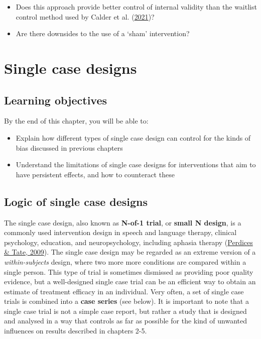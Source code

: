 \documentclass{krantz}
\providecommand{\tightlist}{%
\setlength{\itemsep}{0pt}\setlength{\parskip}{0pt}}
\begin{document}
\begin{itemize}
\tightlist
\item
  Does this approach provide better control of internal validity than the waitlist control method used by Calder et al. (\protect\hyperlink{ref-calder2021}{2021})?
\item
  Are there downsides to the use of a `sham' intervention?
\end{itemize}

\hypertarget{Single}{%
\chapter{Single case designs}\label{Single}}

\hypertarget{learning-objectives-18}{%
\section{Learning objectives}\label{learning-objectives-18}}

By the end of this chapter, you will be able to:

\begin{itemize}
\item
  Explain how different types of single case design can control for the kinds of bias discussed in previous chapters
\item
  Understand the limitations of single case designs for interventions that aim to have persistent effects, and how to counteract these
\end{itemize}

\hypertarget{logic-of-single-case-designs}{%
\section{Logic of single case designs}\label{logic-of-single-case-designs}}

The single case design, also known as \textbf{N-of-1 trial}, or \textbf{small N design}, is a commonly used intervention design in speech and language therapy, clinical psychology, education, and neuropsychology, including aphasia therapy (\protect\hyperlink{ref-perdices2009}{Perdices \& Tate, 2009}). The single case design may be regarded as an extreme version of a \emph{within-subjects} design, where two more more conditions are compared within a single person. This type of trial is sometimes dismissed as providing poor quality evidence, but a well-designed single case trial can be an efficient way to obtain an estimate of treatment efficacy in an individual. Very often, a set of single case trials is combined into a \textbf{case series} (see below). It is important to note that a single case trial is not a simple case report, but rather a study that is designed and analysed in a way that controls as far as possible for the kind of unwanted influences on results described in chapters 2-5.
\end{document}
